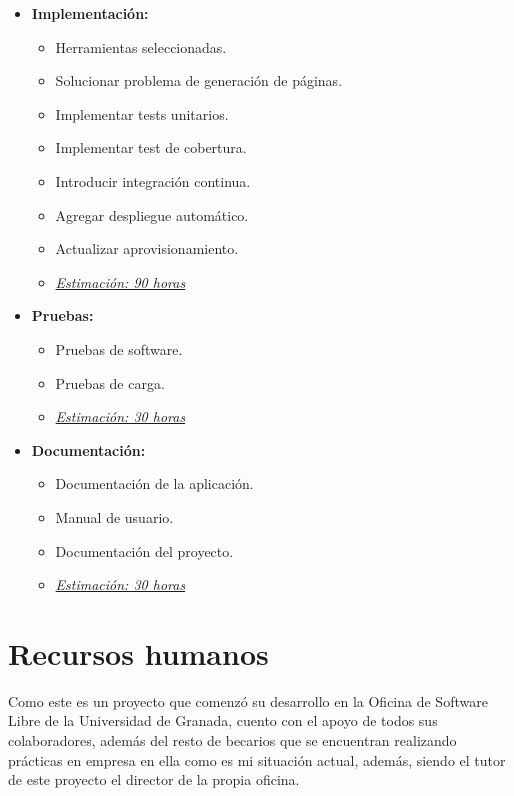 \begin{itemize}
 \item \textbf{Implementación:}
 \begin{itemize}
  \item Herramientas seleccionadas.
  \item Solucionar problema de generación de páginas.
  \item Implementar tests unitarios.
  \item Implementar test de cobertura.
  \item Introducir integración continua.
  \item Agregar despliegue automático.
  \item Actualizar aprovisionamiento.
  \item \underline{\textit{Estimación: 90 horas}}
 \end{itemize}
\end{itemize}

\newpage
\begin{itemize}
 \item \textbf{Pruebas:}
 \begin{itemize}
  \item Pruebas de software.
  \item Pruebas de carga.
  \item \underline{\textit{Estimación: 30 horas}}
 \end{itemize}
\end{itemize}

\begin{itemize}
 \item \textbf{Documentación:}
 \begin{itemize}
  \item Documentación de la aplicación.
  \item Manual de usuario.
  \item Documentación del proyecto.
  \item \underline{\textit{Estimación: 30 horas}}
 \end{itemize}
\end{itemize}

\section{Recursos humanos}

Como este es un proyecto que comenzó su desarrollo en la Oficina de Software Libre de la Universidad de Granada, cuento con el
apoyo de todos sus colaboradores, además del resto de becarios que se encuentran realizando prácticas en empresa en ella
como es mi situación actual, además, siendo el tutor de este proyecto el director de la propia oficina.

